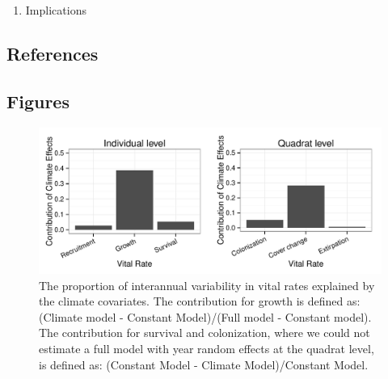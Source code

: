 \documentclass[12pt,]{article}
\begin{document}
\begin{enumerate}
\def\labelenumi{\arabic{enumi}.}
\setcounter{enumi}{2}
\itemsep1pt\parskip0pt
\item
  Implications
\end{enumerate}

\subsection{References}\label{references}

\subsection{Figures}\label{figures}

\begin{figure}[htbp]
\centering
\includegraphics{components/figure/manuscript-figure_1.pdf}
\caption{The proportion of interannual variability in vital rates
explained by the climate covariates. The contribution for growth is
defined as: (Climate model - Constant Model)/(Full model - Constant
model). The contribution for survival and colonization, where we could
not estimate a full model with year random effects at the quadrat level,
is defined as: (Constant Model - Climate Model)/Constant Model.}
\end{figure}
\end{document}
